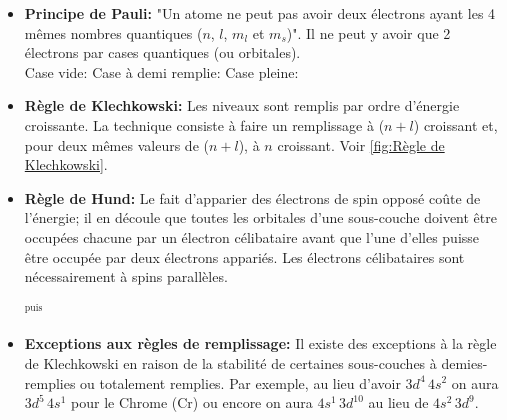 \documentclass{article}
\begin{document}
\begin{itemize}[label=$\ast$]
    \item \textbf{Principe de Pauli:} "Un atome ne peut pas avoir deux électrons ayant
    les 4 mêmes nombres quantiques ($n$, $l$, $m_l$ et $m_s$)".
    Il ne peut y avoir que 2 électrons par cases quantiques (ou orbitales).\\
    Case vide: \electron{}{\emp} \quad Case à demi remplie: \electron{}{\haut} \quad Case pleine: \electron{}{\updwn}

    \item \textbf{Règle de Klechkowski:} Les niveaux sont remplis par ordre d'énergie
    croissante. La technique consiste à faire un remplissage à ($n + l$) croissant et,
    pour deux mêmes valeurs de ($n + l$), à $n$ croissant. Voir \ref{fig:Règle de Klechkowski}.
    \item \textbf{Règle de Hund:} Le fait d'apparier des électrons de spin opposé
    coûte de l'énergie; il en découle que toutes les orbitales d'une sous-couche
    doivent être occupées chacune par un électron célibataire avant que l'une d'elles
    puisse être occupée par deux électrons appariés. Les électrons célibataires sont nécessairement à spins parallèles. 
    \begin{center}
              \hspace{3mm} {\Large $^{\text{puis}}$} \hspace{3mm}
    \end{center}
    \item \textbf{Exceptions aux règles de remplissage:} Il existe des exceptions à la
    règle de Klechkowski en raison de la stabilité de certaines sous-couches à
    demies-remplies ou totalement remplies. Par exemple, au lieu d'avoir
    $3d^4\,4s^2$ on aura $3d^5\,4s^1$ pour le Chrome (Cr) ou encore on aura $4s^1\,3d^10$ au lieu de $4s^2\,3d^9$.
\end{itemize}
\end{document}
